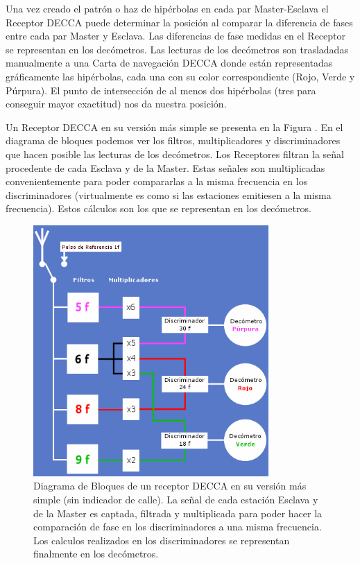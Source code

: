 Una vez creado el patr\'on o haz de hip\'erbolas en cada par Master-Esclava el Receptor DECCA puede determinar la posici\'on al comparar la diferencia de fases entre cada par Master y Esclava. Las diferencias de fase medidas en el Receptor se representan en los dec\'ometros. Las lecturas de los dec\'ometros son trasladadas manualmente a una Carta de navegaci\'on DECCA donde est\'an representadas gr\'aficamente las hip\'erbolas, cada una con su color correspondiente (Rojo, Verde y P\'urpura). El punto de intersecci\'on de al menos dos hip\'erbolas (tres para conseguir mayor exactitud) nos da nuestra posici\'on.

Un Receptor DECCA en su versi\'on m\'as simple se presenta en la Figura . En el diagrama de bloques podemos ver los filtros, multiplicadores y discriminadores que hacen posible las lecturas de los dec\'ometros. Los Receptores filtran la se\~nal procedente de cada Esclava y de la Master. Estas se\~nales son multiplicadas convenientemente para poder compararlas a la misma frecuencia en los discriminadores (virtualmente es como si las estaciones emitiesen a la misma frecuencia). Estos c\'alculos son los que se representan en los dec\'ometros.

\begin{figure}[!h]
  \centering
  \includegraphics[width=0.8\textwidth]{Imagenes/06.01.adf/receptor_decca.gif}
  \caption{Diagrama de Bloques de un receptor DECCA en su versi\'on m\'as simple (sin indicador de calle). La se\~nal de cada estaci\'on Esclava y de la Master es captada, filtrada y multiplicada para poder hacer la comparaci\'on de fase en los discriminadores a una misma frecuencia. Los calculos realizados en los discriminadores se representan finalmente en los dec\'ometros.}
  \label{fig:DECCA-receptor}
\end{figure}

